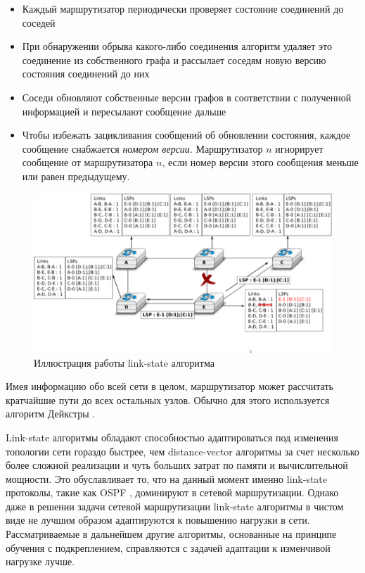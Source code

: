 \documentclass[specification, annotation]{itmo-student-thesis}
\begin{document}
\begin{itemize}
\item Каждый маршрутизатор периодически проверяет состояние соединений до
  соседей
\item При обнаружении обрыва какого-либо соединения алгоритм удаляет это
  соединение из собственного графа и рассылает соседям новую версию состояния
  соединений до них
\item Соседи обновляют собственные версии графов в соответствии с полученной
  информацией и пересылают сообщение дальше
\item Чтобы избежать зацикливания сообщений об обновлении состояния, каждое
  сообщение снабжается \textit{номером версии}. Маршрутизатор $n$ игнорирует
  сообщение от маршрутизатора $n$, если номер версии этого сообщения меньше или
  равен предыдущему.
\end{itemize}

\begin{figure}[!h]
  \caption{Иллюстрация работы link-state алгоритма}\label{ospf-img}
  \centering
  \includegraphics[scale=1.5]{ls-twoway}
\end{figure}

Имея информацию обо всей сети в целом, маршрутизатор может рассчитать кратчайшие
пути до всех остальных узлов. Обычно для этого используется алгоритм
Дейкстры \cite{dijkstra}. 

Link-state алгоритмы обладают способностью адаптироваться под изменения
топологии сети гораздо быстрее, чем distance-vector алгоритмы за счет
несколько более сложной реализации и чуть больших затрат по памяти и
вычислительной мощности. Это обуславливает то, что на данный момент именно
link-state протоколы, такие как OSPF \cite{ospf-rfc}, доминируют в сетевой
маршрутизации. Однако даже в решении задачи сетевой маршрутизации link-state
алгоритмы в чистом виде не лучшим образом адаптируются к повышению нагрузки в
сети. Рассматриваемые в дальнейшем другие алгоритмы, основанные на принципе
обучения с подкреплением, справляются с задачей адаптации к
изменчивой нагрузке лучше.
\end{document}
